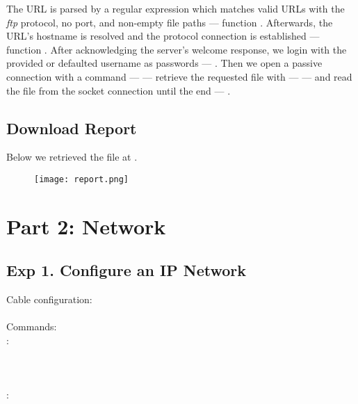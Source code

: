 \documentclass[compilation.tex]{subfiles}
\begin{document}
The URL is parsed by a regular expression which matches valid URLs with the \textsl{ftp} protocol, no port, and non-empty file paths --- function . Afterwards, the URL's hostname is resolved and the protocol connection is established --- function . After acknowledging the server's welcome response, we login with the provided or defaulted username as passwords --- . Then we open a passive connection with a  command ---  --- retrieve the requested file with  ---  --- and read the file from the socket connection until the end --- .

\subsection{Download Report}
Below we retrieved the file at .

\begin{figure}[htb]
\centering
\texttt{[image: report.png]}
\label{fig:report success}
\end{figure}

\section{Part 2: Network}
\label{sec:network}

\subsection[Configure an IP Network]{Exp 1. Configure an IP Network}
\label{subsec:exp1}

\begin{cables}{7}{0.40}
	Cable configuration:\\
	\\
	
	Commands:\\
	:\\
	\\
	\\
	\\
	:\\
	\\
\end{cables}
\end{document}
